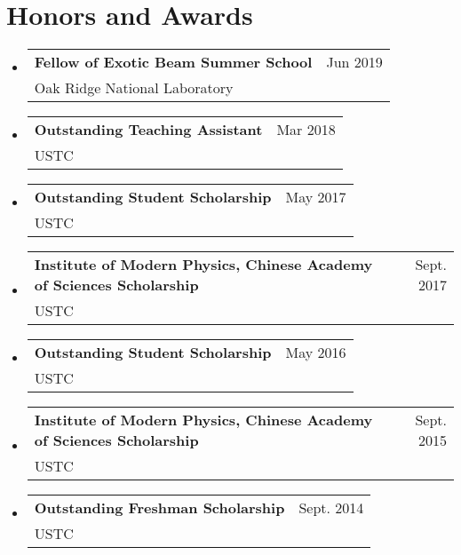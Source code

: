 \documentclass[letterpaper,11pt]{article} %
\makeatletter
\newcommand{\CVSubheading}[4]{
  \vspace{-2pt}\item
    \begin{tabular*}{0.97\textwidth}[t]{l@{\extracolsep{\fill}}r}
      \textbf{#1} & #2 \\
      \small#3 & \small #4 \\
    \end{tabular*}\vspace{-7pt}
}
\newcommand{\CVSubHeadingListStart}{\begin{itemize}[leftmargin=0.5cm, label={}]}
\newcommand{\CVSubHeadingListEnd}{\end{itemize}}
\makeatother
\begin{document}
\section{Honors and Awards}
\CVSubHeadingListStart
    \CVSubheading
          {Fellow of Exotic Beam Summer School}{Jun 2019}
          {Oak Ridge National Laboratory}{}
    \CVSubheading
          {Outstanding Teaching Assistant}{Mar 2018}
          {USTC}{}
    \CVSubheading
          {Outstanding Student Scholarship}{May 2017}
          {USTC}{}
    \CVSubheading
          {Institute of Modern Physics, Chinese Academy of Sciences Scholarship}{Sept. 2017}
          {USTC}{}
    \CVSubheading
          {Outstanding Student Scholarship}{May 2016}
          {USTC}{}
    \CVSubheading
          {Institute of Modern Physics, Chinese Academy of Sciences Scholarship}{Sept. 2015}
          {USTC}{}
    \CVSubheading
          {Outstanding Freshman Scholarship}{Sept. 2014}
          {USTC}{}
\CVSubHeadingListEnd
\end{document}
